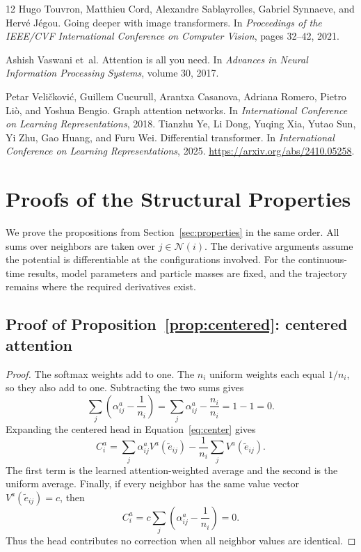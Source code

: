 \documentclass[10pt,letterpaper,twocolumn]{article}
\newcommand{\cN}{\mathcal N}
\numberwithin{equation}{section}
\begin{document}
\begin{thebibliography}{12}
Hugo Touvron, Matthieu Cord, Alexandre Sablayrolles, Gabriel Synnaeve, and Herv{\'e} J{\'e}gou.
\newblock Going deeper with image transformers.
\newblock In \emph{Proceedings of the IEEE/CVF International Conference on Computer Vision}, pages 32--42, 2021.

Ashish Vaswani et~al.
\newblock Attention is all you need.
\newblock In \emph{Advances in Neural Information Processing Systems}, volume 30, 2017.

Petar Veli{\v{c}}kovi{\'c}, Guillem Cucurull, Arantxa Casanova, Adriana Romero, Pietro Li{\`o}, and Yoshua Bengio.
\newblock Graph attention networks.
\newblock In \emph{International Conference on Learning Representations}, 2018.
Tianzhu Ye, Li Dong, Yuqing Xia, Yutao Sun, Yi Zhu, Gao Huang, and Furu Wei.
\newblock Differential transformer.
\newblock In \emph{International Conference on Learning Representations}, 2025.
\newblock \url{https://arxiv.org/abs/2410.05258}.
\end{thebibliography}
\clearpage

\appendix
\section{Proofs of the Structural Properties}
\label{app:proofs}

We prove the propositions from Section~\ref{sec:properties} in the same order. All sums over
neighbors are taken over $j\in\cN(i)$. The derivative arguments assume the potential is
differentiable at the configurations involved. For the continuous-time results, model parameters
and particle masses are fixed, and the trajectory remains where the required derivatives exist.

\subsection{Proof of Proposition~\ref{prop:centered}: centered attention}
\label{proof:centered}

\begin{proof}
The softmax weights add to one. The $n_i$ uniform weights each equal $1/n_i$, so they also add to
one. Subtracting the two sums gives
\[
\sum_j\left(\alpha_{ij}^a-\frac{1}{n_i}\right)
=\sum_j\alpha_{ij}^a-\frac{n_i}{n_i}=1-1=0.
\]
Expanding the centered head in Equation~\eqref{eq:center} gives
\[
C_i^a=\sum_j\alpha_{ij}^aV^a(\widetilde e_{ij})
-\frac{1}{n_i}\sum_jV^a(\widetilde e_{ij}).
\]
The first term is the learned attention-weighted average and the second is the uniform average.
Finally, if every neighbor has the same value vector $V^a(\widetilde e_{ij})=c$, then
\[
C_i^a=c\sum_j\left(\alpha_{ij}^a-\frac{1}{n_i}\right)=0.
\]
Thus the head contributes no correction when all neighbor values are identical.
\end{proof}
\end{document}
